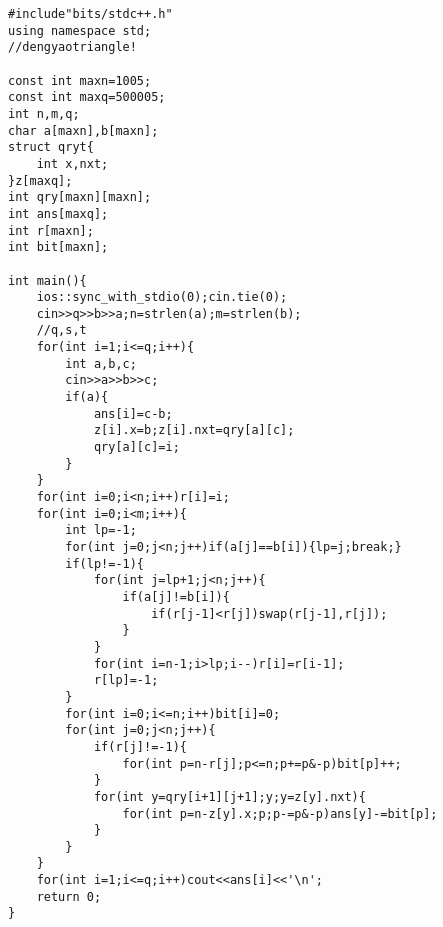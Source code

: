 \documentclass[12pt]{ctexart}
\begin{document}
\begin{lstlisting}
#include"bits/stdc++.h"
using namespace std;
//dengyaotriangle!

const int maxn=1005;
const int maxq=500005;
int n,m,q;
char a[maxn],b[maxn];
struct qryt{
    int x,nxt;
}z[maxq];
int qry[maxn][maxn];
int ans[maxq];
int r[maxn];
int bit[maxn];

int main(){
    ios::sync_with_stdio(0);cin.tie(0);
    cin>>q>>b>>a;n=strlen(a);m=strlen(b);
	//q,s,t
    for(int i=1;i<=q;i++){
        int a,b,c;
        cin>>a>>b>>c;
        if(a){
            ans[i]=c-b;
            z[i].x=b;z[i].nxt=qry[a][c];
            qry[a][c]=i;
        }
    }    
    for(int i=0;i<n;i++)r[i]=i;
    for(int i=0;i<m;i++){
        int lp=-1;
        for(int j=0;j<n;j++)if(a[j]==b[i]){lp=j;break;}
        if(lp!=-1){
            for(int j=lp+1;j<n;j++){
                if(a[j]!=b[i]){
                    if(r[j-1]<r[j])swap(r[j-1],r[j]);
                }
            }
            for(int i=n-1;i>lp;i--)r[i]=r[i-1];
            r[lp]=-1;
        }
        for(int i=0;i<=n;i++)bit[i]=0;
        for(int j=0;j<n;j++){
            if(r[j]!=-1){
                for(int p=n-r[j];p<=n;p+=p&-p)bit[p]++;
            }
            for(int y=qry[i+1][j+1];y;y=z[y].nxt){
                for(int p=n-z[y].x;p;p-=p&-p)ans[y]-=bit[p];
            }
        }
    }
    for(int i=1;i<=q;i++)cout<<ans[i]<<'\n';
    return 0;
}
\end{lstlisting}
\end{document}
